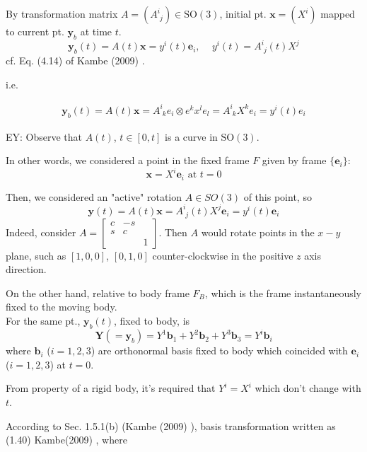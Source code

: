 By transformation matrix $A = (A^i_{ \, \, j }) \in \text{SO}(3)$, initial pt. $\mathbf{x} = (X^i)$ mapped to current pt. $\mathbf{y}_b$ at time $t$.
\begin{equation}
\mathbf{y}_b(t) = A(t) \mathbf{x} = y^i (t) \mathbf{e}_i, \quad \, y^i(t) = A^i_{ \, \, j}(t)X^j
\end{equation}
cf. Eq. (4.14) of Kambe (2009) \cite{dgdt:TKambe2009}.

i.e.

\[
\begin{gathered}
\mathbf{y}_b(t) = A(t) \mathbf{x} = A^i_{\,\, k} e_i \otimes e^k x^l e_l = A^i_{ \, \, k} X^k e_i = y^i(t) e_i
\end{gathered}
\]

EY: Observe that $A(t)$, $t\in [0,t]$ is a curve in $\text{SO}(3)$.

In other words, we considered a point in the fixed frame $F$ given by frame $\lbrace \mathbf{e}_i \rbrace$:
\[
\mathbf{x} = X^i \mathbf{e}_i \text{ at } t = 0
\]

Then, we considered an "active" rotation $A \in SO(3)$ of this point, so 
\begin{equation}
	\mathbf{y}(t) = A(t) \mathbf{x} = A^i_{ \, \, j}(t) X^j \mathbf{e}_i = y^i(t) \mathbf{e}_i
\end{equation}
Indeed, consider $A = \left[ \begin{matrix} c & -s & \\ s & c & \\ & & 1 \end{matrix} \right]$. Then $A$ would rotate points in the $x-y$ plane, such as $[1, 0, 0]$, $[0, 1, 0]$ counter-clockwise in the positive $z$ axis direction.

On the other hand, relative to body frame $F_B$, which is the frame instantaneously fixed to the moving body. \\
For the same pt., $\mathbf{y}_b(t)$, fixed to body, is
\[
\mathbf{Y}(=\mathbf{y}_b) = Y^1 \mathbf{b}_1 + Y^2 \mathbf{b}_2 + Y^3 \mathbf{b}_3 = Y^i \mathbf{b}_i
\]
where $\mathbf{b}_i$ ($i=1,2,3$) are orthonormal basis fixed to body which coincided with $\mathbf{e}_i$ ($i=1,2,3$) at $t=0$. 

From property of a rigid body, it's required that $Y^i = X^i$ which don't change with $t$.

According to Sec. 1.5.1(b) (Kambe (2009) \cite{dgdt:TKambe2009}), basis transformation written as (1.40) Kambe(2009) \cite{dgdt:TKambe2009}, where 

